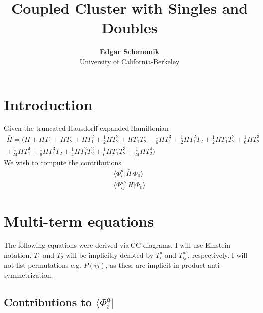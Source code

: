 \documentclass[letterpaper,12pt]{article}
\newcommand{\ket}[1]{\lvert #1 \rangle}
\newcommand{\bra}[1]{\langle #1 \vert}
\begin{document}
\title{\bf Coupled Cluster with Singles and Doubles}

\author{
{\bf Edgar Solomonik }\\
University of California-Berkeley
}

\maketitle

\section{Introduction}

Given the truncated Hausdorff expanded Hamiltonian
\begin{align*}
\bar{H} = (H+HT_1 +HT_2 +HT_1^2 + \frac{1}{2}HT_2^2+HT_1T_2+\frac{1}{6}HT_1^3
              +\frac{1}{2}HT_1^2T_2+\frac{1}{2}HT_1T_2^2+\frac{1}{6}HT^3_2 \\
              +\frac{1}{24}HT_1^4+\frac{1}{6}HT_1^3T_2+\frac{1}{4}HT_1^2T_2^2
              +\frac{1}{6}HT_1T_2^3+\frac{1}{24}HT_2^4)
\end{align*}
We wish to compute the contributions
\begin{align*}
\bra{\Phi^a_i}\bar{H}\ket{\Phi_0} \\
\bra{\Phi^{ab}_{ij}}\bar{H}\ket{\Phi_0} 
\end{align*}

\section{Multi-term equations}

The following equations were derived via CC diagrams. I will use 
Einstein notation. $T_1$ and $T_2$ will be implicitly denoted by 
$T^a_i$ and $T^{ab}_{ij}$, respectively. I will not list permutations
e.g. $P(ij)$, as these are implicit in product anti-symmetrization.

\subsection{Contributions to $\bra{\Phi^a_i}$}
\end{document}
